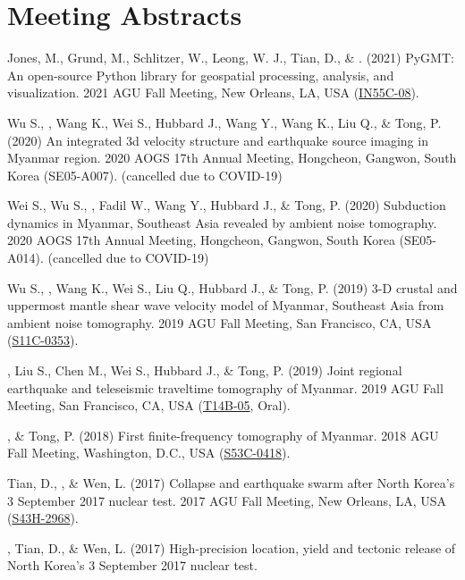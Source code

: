 \section{Meeting Abstracts}

\begin{etaremune}
\item Jones, M., Grund, M., Schlitzer, W., Leong, W. J., Tian, D., \& \Yao. (2021)
    PyGMT: An open-source Python library for geospatial processing, analysis, and visualization.
    2021 AGU Fall Meeting, New Orleans, LA, USA (\href{http://adsabs.harvard.edu/abs/2017AGUFM.S43H2967Y}{IN55C-08}).
\item Wu S., \Yao, Wang K., Wei S., Hubbard J., Wang Y., Wang K., Liu Q., \& Tong, P. (2020)
    An integrated 3d velocity structure and earthquake source imaging in Myanmar region.
    2020 AOGS 17th Annual Meeting, Hongcheon, Gangwon, South Korea (SE05-A007). (cancelled due to COVID-19)
\item
    Wei S., Wu S., \Yao, Fadil W., Wang Y., Hubbard J., \& Tong, P. (2020)
    Subduction dynamics in Myanmar, Southeast Asia revealed by ambient noise tomography.
    2020 AOGS 17th Annual Meeting, Hongcheon, Gangwon, South Korea (SE05-A014). (cancelled due to COVID-19)
\item
    Wu S., \Yao, Wang K., Wei S., Liu Q., Hubbard J., \& Tong, P. (2019)
    3-D crustal and uppermost mantle shear wave velocity model of Myanmar, Southeast Asia from ambient noise tomography.
    2019 AGU Fall Meeting, San Francisco, CA, USA (\href{https://agu.confex.com/agu/fm19/meetingapp.cgi/Paper/511238}{S11C-0353}).
\item
    \Yao, Liu S., Chen M., Wei S., Hubbard J., \& Tong, P. (2019)
    Joint regional earthquake and teleseismic traveltime tomography of Myanmar.
    2019 AGU Fall Meeting, San Francisco, CA, USA (\href{https://agu.confex.com/agu/fm19/meetingapp.cgi/Paper/532179}{T14B-05}, Oral).
\item
    \Yao, \& Tong, P. (2018)
    First finite-frequency tomography of Myanmar.
    2018 AGU Fall Meeting, Washington, D.C., USA (\href{http://adsabs.harvard.edu/abs/2018AGUFM.S53C0418Y}{S53C-0418}).
\item
    Tian, D., \Yao, \& Wen, L. (2017)
    Collapse and earthquake swarm after North Korea's 3 September 2017 nuclear test.
    2017 AGU Fall Meeting, New Orleans, LA, USA (\href{http://adsabs.harvard.edu/abs/2017AGUFM.S43H2968T}{S43H-2968}).
\item
    \Yao, Tian, D., \& Wen, L. (2017)
    High-precision location, yield and tectonic release of North Korea's 3 September 2017 nuclear test.

\end{etaremune}
